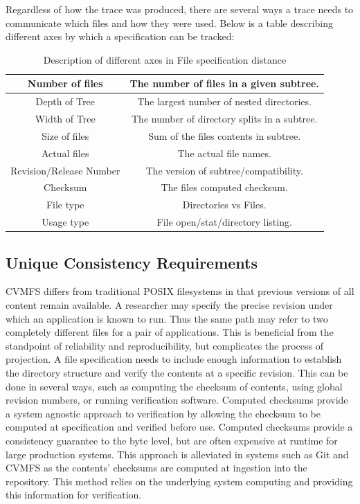 \documentclass[conference]{IEEEtran}
\begin{document}
Regardless of how the trace was produced,
there are several ways a trace needs to communicate 
which files and how they were used.
Below is a table describing different axes by which a 
specification can be tracked:
\begin{table}[h]
    \centering
    \begin{tabular}{|c|c|}
    \hline
    Number of files & The number of files in a given subtree. \\ \hline
    Depth of Tree & The largest number of nested directories. \\ \hline
    Width of Tree & The number of directory splits in a subtree.\\ \hline
    Size of files & Sum of the files contents in subtree.\\ \hline
    Actual files & The actual file names.\\ \hline
    Revision/Release Number & The version of subtree/compatibility. \\ \hline
    Checksum & The files computed checksum. \\ \hline
    File type & Directories vs Files.\\ \hline
    Usage type & File open/stat/directory listing.\\ \hline
    \end{tabular}
    \caption{Description of different axes in File specification distance}
    \label{tab:distance_axes}
\end{table}


\subsection{Unique Consistency Requirements}
CVMFS differs from traditional POSIX filesystems in that previous versions of all content remain available.
A researcher may specify the precise revision under which an application is known to run.
Thus the same path may refer to two completely different files for a pair of applications.
This is beneficial from the standpoint of reliability and reproducibility,
but complicates the process of projection.
A file specification needs to include enough information
to establish the directory structure and verify the contents at a specific revision.
This can be done in several ways, 
such as computing the checksum of contents,
using global revision numbers, 
or running verification software.
Computed checksums provide a system agnostic approach
to verification by allowing the checksum to be computed
at specification and verified before use.
Computed checksums provide a
consistency guarantee to the byte level,
but are often expensive at runtime for large
production systems.
This approach is alleviated in systems such as 
Git and CVMFS as the contents' checksums are 
computed at ingestion into the repository.
This method relies on the underlying system computing
and providing this information for verification.
\end{document}
